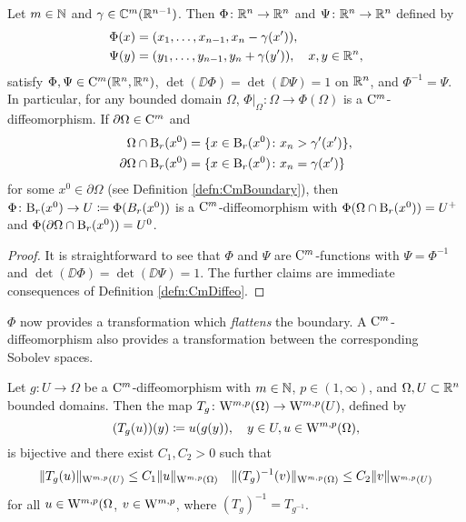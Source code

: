 \begin{lem}
  Let $m \in \mathbb{N}$ and $\gamma \in \mathbb{C}^m(\mathbb{R}^{n - 1})$.
  Then $\Phi \colon \mathbb{R}^n \to \mathbb{R}^n$ and $\Psi \colon \mathbb{R}^n \to \mathbb{R}^n$ defined by
  \begin{align*}
    \Phi(x) &= (x_1,\dots,x_{n - 1}, x_n - \gamma(x')),\\
    \Psi(y) &= (y_1,\dots,y_{n - 1}, y_n + \gamma(y')), \quad x,y \in \mathbb{R}^n,
  \end{align*}
  satisfy $\Phi,\Psi \in \mathrm{C}^m(\mathbb{R}^n,\mathbb{R}^n)$, $\det(\DD\Phi) = \det(\DD \Psi) =1$ on $\mathbb{R}^n$, and $\Phi^{-1} = \Psi$.
  In particular, for any bounded domain $\Omega$, $\Phi|_\Omega \colon \Omega \to \Phi(\Omega)$ is a $\mathrm{C}^m$-diffeomorphism.
  If $\partial \Omega \in \mathrm{C}^m$ and 
  \begin{align*}
    \Omega \cap \mathrm{B}_r(x^0) &= \{ x \in \mathrm{B}_r(x^0) \colon x_n > \gamma'(x')\},\\
    \partial \Omega \cap \mathrm{B}_r(x^0) &= \{ x \in \mathrm{B}_r(x^0) \colon x_n = \gamma(x')\}
  \end{align*}
  for some $x^0 \in \partial \Omega$ (see Definition \ref{defn:CmBoundary}), then $\Phi\colon \mathrm{B}_r(x^0) \to U \coloneqq \Phi(B_r(x^0))$ is a $\mathrm{C}^m$-diffeomorphism with $\Phi(\Omega \cap \mathrm{B}_r(x^0)) = U^+$ and $\Phi(\partial\Omega \cap \mathrm{B}_r(x^0)) = U^0$.
\end{lem}

\begin{proof}
  It is straightforward to see that $\Phi$ and $\Psi$ are $\mathrm{C}^m$-functions with $\Psi = \Phi^{-1}$ and $\det(\DD\Phi) = \det(\DD\Psi) = 1$.
  The further claims are immediate consequences of Definition \ref{defn:CmDiffeo}.
\end{proof}

$\Phi$ now provides a transformation which \emph{flattens} the boundary.
A $\mathrm{C}^m$-diffeomorphism also provides a transformation between the corresponding Sobolev spaces.

\begin{prop}
  Let $g \colon U \to \Omega$ be a $\mathrm{C}^m$-diffeomorphism with $m \in \mathbb{N}$, $p \in (1,\infty)$, and $\Omega,U \subset \mathbb{R}^n$ bounded domains.
  Then the map $T_g \colon \mathrm{W}^{m,p}(\Omega) \to \mathrm{W}^{m,p}(U)$, defined by
  $$
  (T_g(u))(y) \coloneqq u(g(y)), \quad y \in U, u \in \mathrm{W}^{m,p}(\Omega),
  $$
  is bijective and there exist $C_1, C_2 > 0$ such that
  $$
  \|T_g(u)\|_{\mathrm{W}^{m,p}(U)} \leq C_1 \|u\|_{\mathrm{W}^{m,p}(\Omega)}
  \quad 
  \|(T_g)^{-1}(v)\|_{\mathrm{W}^{m,p}(\Omega)} \leq C_2 \|v\|_{\mathrm{W}^{m,p}(U)}
  $$
  for all $u \in \mathrm{W}^{m,p}(\Omega$, $v \in \mathrm{W}^{m,p}$, where $(T_g)^{-1} = T_{g^{-1}}$.
\end{prop}

